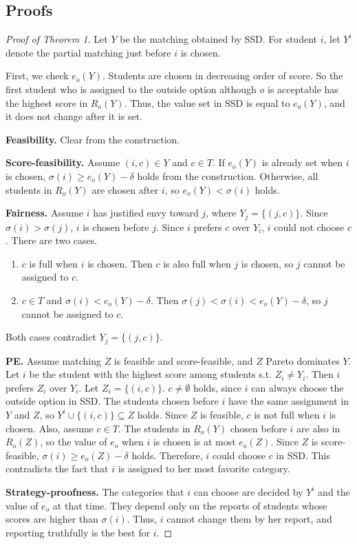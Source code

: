 \documentclass{article}
\begin{document}
\subsection{Proofs}
\begin{proof}[Proof of Theorem 1]
Let $Y$ be the matching obtained by SSD.
For student $i$, let $Y^i$ denote the partial matching just before $i$ is chosen.

First, we check $e_o(Y)$.
Students are chosen in decreasing order of score.
So the first student who is assigned to the outside option although $o$ is acceptable
has the highest score in $R_o(Y)$.
Thus, the value set in SSD is equal to $e_o(Y)$, and it does not change after it is set.

\textbf{Feasibility.} Clear from the construction.

\textbf{Score-feasibility.}
Assume $(i,c)\in Y$ and $c\in T$.
If $e_o(Y)$ is already set when $i$ is chosen, $\sigma(i)\ge e_o(Y)-\delta$ holds
from the construction.
Otherwise, all students in $R_o(Y)$ are chosen after $i$, so $e_o(Y)<\sigma(i)$ holds.

\textbf{Fairness.}
Assume $i$ has justified envy toward $j$, where $Y_j=\{(j,c)\}$.
Since $\sigma(i)>\sigma(j)$, $i$ is chosen before $j$.
Since $i$ prefers $c$ over $Y_i$, $i$ could not choose $c$. There are two cases.
\begin{enumerate}
\item $c$ is full when $i$ is chosen.
Then $c$ is also full when $j$ is chosen, so $j$ cannot be assigned to $c$.
\item $c\in T$ and $\sigma(i)<e_o(Y)-\delta$.
Then $\sigma(j)<\sigma(i)<e_o(Y)-\delta$, so $j$ cannot be assigned to $c$.
\end{enumerate}
Both cases contradict $Y_j=\{(j,c)\}$.

\textbf{PE.}
Assume matching $Z$ is feasible and score-feasible, and $Z$ Pareto dominates $Y$.
Let $i$ be the student with the highest score among students s.t. $Z_i\neq Y_i$.
Then $i$ prefers $Z_i$ over $Y_i$. Let $Z_i=\{(i,c)\}$.
$c\neq\emptyset$ holds, since $i$ can always choose the outside option in SSD.
The students chosen before $i$ have the same assignment in $Y$ and $Z$,
so $Y^i\cup\{(i,c)\}\subseteq Z$ holds.
Since $Z$ is feasible, $c$ is not full when $i$ is chosen.
Also, assume $c\in T$.
The students in $R_o(Y)$ chosen before $i$ are also in $R_o(Z)$, so the value of $e_o$
when $i$ is chosen is at most $e_o(Z)$.
Since $Z$ is score-feasible, $\sigma(i)\ge e_o(Z)-\delta$ holds.
Therefore, $i$ could choose $c$ in SSD.
This contradicts the fact that $i$ is assigned to her most favorite category.

\textbf{Strategy-proofness.}
The categories that $i$ can choose are decided by $Y^i$ and the value of $e_o$ at that time.
They depend only on the reports of students whose scores are higher than $\sigma(i)$.
Thus, $i$ cannot change them by her report, and reporting truthfully is the best for $i$.
\end{proof}
\end{document}
